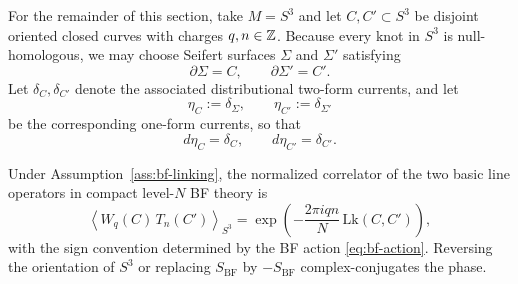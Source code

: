 \begin{assumption}\label{ass:bf-linking}
For the remainder of this section, take $M=S^3$ and let $C,C'\subset S^3$ be disjoint oriented closed curves with charges $q,n\in \mathbb{Z}$. Because every knot in $S^3$ is null-homologous, we may choose Seifert surfaces $\Sigma$ and $\Sigma'$ satisfying
\begin{equation*}
\partial \Sigma = C,
\qquad
\partial \Sigma' = C'.
\end{equation*}
Let $\delta_C,\delta_{C'}$ denote the associated distributional two-form currents, and let
\begin{equation*}
\eta_C:=\delta_\Sigma,
\qquad
\eta_{C'}:=\delta_{\Sigma'}
\end{equation*}
be the corresponding one-form currents, so that
\begin{equation}\label{eq:bf-current-boundaries}
d\eta_C=\delta_C,
\qquad
d\eta_{C'}=\delta_{C'}.
\end{equation}
\end{assumption}

\begin{proposition}\label{prop:bf-linking}
Under Assumption~\ref{ass:bf-linking}, the normalized correlator of the two basic line operators in compact level-$N$ BF theory is
\begin{equation}\label{eq:bf-linking-phase}
\left\langle W_q(C)\,T_n(C')\right\rangle_{S^3}
=
\exp\!\left(-\frac{2\pi i q n}{N}\,\mathrm{Lk}(C,C')\right),
\end{equation}
with the sign convention determined by the BF action \eqref{eq:bf-action}. Reversing the orientation of $S^3$ or replacing $S_{\mathrm{BF}}$ by $-S_{\mathrm{BF}}$ complex-conjugates the phase.
\end{proposition}

